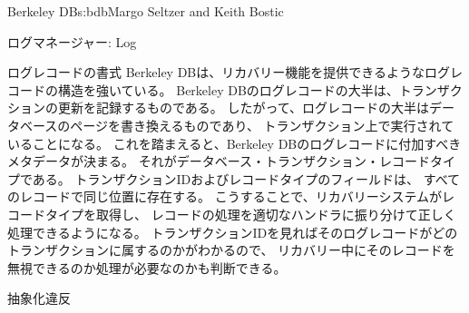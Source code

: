 \begin{aosachapter}{Berkeley DB}{s:bdb}{Margo Seltzer and Keith Bostic}
\begin{aosasect1}{ログマネージャー: Log}
\begin{aosasect2}{ログレコードの書式}
Berkeley DBは、リカバリー機能を提供できるようなログレコードの構造を強いている。
Berkeley DBのログレコードの大半は、トランザクションの更新を記録するものである。
したがって、ログレコードの大半はデータベースのページを書き換えるものであり、
トランザクション上で実行されていることになる。
これを踏まえると、Berkeley DBのログレコードに付加すべきメタデータが決まる。
それがデータベース・トランザクション・レコードタイプである。
トランザクションIDおよびレコードタイプのフィールドは、
すべてのレコードで同じ位置に存在する。
こうすることで、リカバリーシステムがレコードタイプを取得し、
レコードの処理を適切なハンドラに振り分けて正しく処理できるようになる。
トランザクションIDを見ればそのログレコードがどのトランザクションに属するのかがわかるので、
リカバリー中にそのレコードを無視できるのか処理が必要なのかも判断できる。

\end{aosasect2}

\begin{aosasect2}{抽象化違反}


\end{aosasect2}
\end{aosasect1}
\end{aosachapter}
